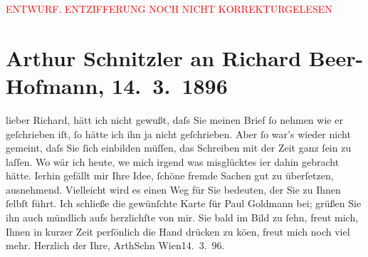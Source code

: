 
\begin{center}
            \textcolor{red}{ENTWURF. ENTZIFFERUNG NOCH NICHT KORREKTURGELESEN}
                      \end{center}
            
               \section[Arthur Schnitzler an Richard Beer-Hofmann, 14. 3. 1896]{ Arthur Schnitzler an Richard Beer-Hofmann, 14. 3. 1896}\nopagebreak{}\rehead{ }\begin{ledgroupsized}[t]{13cm}\normalsize\beginnumbering{} \toendnotes[C]{\smallbreak\pagebreak[2]} 
\pstart
           \noindent{}{\pb}lieber Richard, hätt ich nicht gewußt, daſs Sie meinen Brief ſo
               nehmen wie er geſchrieben iſt, ſo hätte ich ihn ja nicht geſchrieben. Aber ſo war’s
               wieder nicht gemeint, daſs Sie ſich einbilden \introOben{}müſſen\introOben{}, das
               Schreiben mit der Zeit ganz ſein zu laſſen. Wo wär ich heute, we{\geminationn} mich irgend was misglücktes i{\geminationm}er dahin gebracht hätte. I{\geminationm}erhin gefällt mir Ihre Idee, ſchöne fremde Sachen gut zu überſetzen, ausnehmend.
               Vielleicht wird es einen Weg für Sie bedeuten, der Sie zu Ihnen ſelbſt führt.\pend
           \pstart
           {\pb}Ich schließe die gewünſchte Karte für Paul Goldmann bei; grüßen Sie ihn auch mündlich
               aufs herzlichſte von mir. Sie bald im Bild zu ſehn, freut mich, Ihnen in kurzer Zeit
               perſönlich die Hand drücken zu kö{\geminationn}en, freut mich noch
               viel mehr.\pend
           \pstart Herzlich der Ihre, \spacefill\mbox{ArthSchn}\pend{}\pstart
           Wien14. 3. 96.\pend
           \endnumbering{}\end{ledgroupsized}  \newcommand{\dateiname}{L00539}\newcommand{\titel}{Arthur Schnitzler an Richard Beer-Hofmann, 14. 3. 1896}\newcommand{\editorInnen}{Martin Anton Müller und Gerd-Hermann Susen}
      